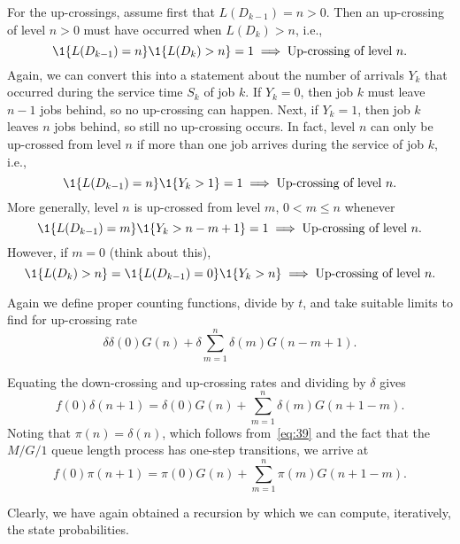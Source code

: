 For the up-crossings, assume first that $L(D_{k-1})=n>0$. Then an up-crossing of level $n>0$ must have occurred when $L(D_k)>n$, i.e., 
 \begin{equation*}
 \1{L(D_{k-1}) = n}\1{L(D_k)>n} = 1 \implies \text{Up-crossing of level $n$}.
 \end{equation*}
Again, we can convert this into a statement about the number of
arrivals $Y_k$ that occurred during the service time $S_k$ of job $k$. If $Y_k=0$, then
job $k$ must leave $n-1$ jobs behind, so no up-crossing can
happen. Next, if $Y_k=1$, then job $k$ leaves $n$ jobs behind, so
still no up-crossing occurs. In fact, level $n$ can only be up-crossed from level $n$ if
more than one job arrives during the service of job $k$, i.e.,
\begin{equation*}
\1{L(D_{k-1})=n} \1{Y_{k}>1} = 1 \implies \text{Up-crossing of level $n$}.
\end{equation*}
More generally, level $n$ is up-crossed from level $m$, $0<m\leq n$ whenever
\begin{equation*}
\1{L(D_{k-1})=m} \1{Y_{k}>n-m+1} = 1 \implies \text{Up-crossing of level $n$}.
\end{equation*}
However, if $m=0$ (think about this),
\begin{equation*}
\1{L(D_{k})>n} = \1{L(D_{k-1})=0} \1{Y_{k}>n} \implies \text{Up-crossing of level $n$}.
\end{equation*}

Again we define proper counting functions, divide by $t$, and take suitable limits to find for up-crossing rate
\begin{equation}\label{eq:555}
\delta \delta(0) G(n) + \delta \sum_{m=1}^n \delta(m) G(n-m+1).
\end{equation}


Equating the down-crossing and up-crossing rates and dividing
by $\delta$ gives
\begin{equation*}
 f(0) \delta(n+1) = \delta(0) G(n) + \sum_{m=1}^{n} \delta(m) G(n+1-m).
\end{equation*}
Noting that $\pi(n) = \delta(n)$, which follows from~\cref{eq:39} and the fact that the $M/G/1$ queue length process has one-step transitions, we arrive at
\begin{equation}\label{eq:72}
 f(0) \pi(n+1) = \pi(0) G(n) + \sum_{m=1}^{n} \pi(m) G(n+1-m).
\end{equation}

Clearly, we have again obtained a recursion by which we can compute, iteratively, the state probabilities. 


